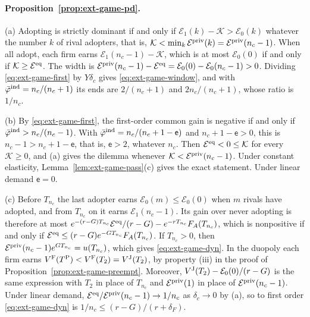 \paragraph{Proposition~\ref{prop:ext-game-pd}.} (a) Adopting is strictly dominant if and only if $\mathcal E_1(k)-\mathcal K>\mathcal E_0(k)$ whatever the number $k$ of rival adopters, that is, $\mathcal K<\min_k\mathcal E^{\rm priv}(k)=\mathcal E^{\rm priv}(n_c-1)$. When all adopt, each firm earns $\mathcal E_1(n_c-1)-\mathcal K$, which is at most $\mathcal E_0(0)$ if and only if $\mathcal K\ge\mathcal E^{\rm eq}$. The width is $\mathcal E^{\rm priv}(n_c-1)-\mathcal E^{\rm eq}=\mathcal E_0(0)-\mathcal E_0(n_c-1)>0$. Dividing \eqref{eq:ext-game-first} by $Y\delta_c$ gives \eqref{eq:ext-game-window}, and with $\bar\varphi^{\rm ind}=n_c/(n_c+1)$ its ends are $2/(n_c+1)$ and $2n_c/(n_c+1)$, whose ratio is $1/n_c$.

(b) By \eqref{eq:ext-game-first}, the first-order common gain is negative if and only if $\bar\varphi^{\rm ind}>n_c/(n_c-1)$. With $\bar\varphi^{\rm ind}=n_c/(n_c+1-\mathsf e)$ and $n_c+1-\mathsf e>0$, this is $n_c-1>n_c+1-\mathsf e$, that is, $\mathsf e>2$, whatever $n_c$. Then $\mathcal E^{\rm eq}<0\le\mathcal K$ for every $\mathcal K\ge0$, and (a) gives the dilemma whenever $\mathcal K<\mathcal E^{\rm priv}(n_c-1)$. Under constant elasticity, Lemma~\ref{lem:ext-game-pass}(c) gives the exact statement. Under linear demand $\mathsf e=0$.

(c) Before $T_{n_c}$ the last adopter earns $\mathcal E_0(m)\le\mathcal E_0(0)$ when $m$ rivals have adopted, and from $T_{n_c}$ on it earns $\mathcal E_1(n_c-1)$. Its gain over never adopting is therefore at most $e^{-(r-G)T_{n_c}}\mathcal E^{\rm eq}/(r-G)-e^{-rT_{n_c}}F_A(T_{n_c})$, which is nonpositive if and only if $\mathcal E^{\rm eq}\le(r-G)e^{-GT_{n_c}}F_A(T_{n_c})$. If $T_{n_c}>0$, then $\mathcal E^{\rm priv}(n_c-1)e^{GT_{n_c}}=u(T_{n_c})$, which gives \eqref{eq:ext-game-dyn}. In the duopoly each firm earns $V^{\rm F}(T^{\rm P})<V^{\rm F}(T_2)=V^{\rm J}(T_2)$, by property (iii) in the proof of Proposition~\ref{prop:ext-game-preempt}. Moreover, $V^{\rm J}(T_2)-\mathcal E_0(0)/(r-G)$ is the same expression with $T_2$ in place of $T_{n_c}$ and $\mathcal E^{\rm priv}(1)$ in place of $\mathcal E^{\rm priv}(n_c-1)$. Under linear demand, $\mathcal E^{\rm eq}/\mathcal E^{\rm priv}(n_c-1)\to1/n_c$ as $\delta_c\to0$ by (a), so to first order \eqref{eq:ext-game-dyn} is $1/n_c\le(r-G)/(r+\delta_F)$.

